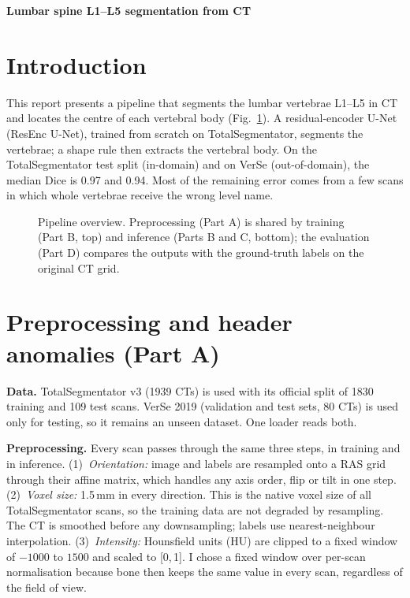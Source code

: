 \documentclass[10pt,a4paper]{article}
\begin{document}
\small

{\sffamily\bfseries\Large Lumbar spine L1--L5 segmentation from CT}

\section{Introduction}
This report presents a pipeline that segments the lumbar vertebrae L1--L5 in CT and locates the centre of each vertebral body (Fig.~\ref{fig:pipeline}). A residual-encoder U-Net (ResEnc U-Net), trained from scratch on TotalSegmentator, segments the vertebrae; a shape rule then extracts the vertebral body. On the TotalSegmentator test split (in-domain) and on VerSe (out-of-domain), the median Dice is 0.97 and 0.94. Most of the remaining error comes from a few scans in which whole vertebrae receive the wrong level name.

\begin{figure}[h]
\centering
\resizebox{0.72\linewidth}{!}{}
\caption{Pipeline overview. Preprocessing (Part A) is shared by training (Part B, top) and inference (Parts B and C, bottom); the evaluation (Part D) compares the outputs with the ground-truth labels on the original CT grid.}
\label{fig:pipeline}
\end{figure}

\section{Preprocessing and header anomalies (Part A)}
\textbf{Data.} TotalSegmentator v3 (1939 CTs) is used with its official split of 1830 training and 109 test scans. VerSe 2019 (validation and test sets, 80 CTs) is used only for testing, so it remains an unseen dataset. One loader reads both.

\textbf{Preprocessing.} Every scan passes through the same three steps, in training and in inference.
(1)~\emph{Orientation:} image and labels are resampled onto a RAS grid through their affine matrix, which handles any axis order, flip or tilt in one step.
(2)~\emph{Voxel size:} 1.5\,mm in every direction. This is the native voxel size of all TotalSegmentator scans, so the training data are not degraded by resampling. The CT is smoothed before any downsampling; labels use nearest-neighbour interpolation.
(3)~\emph{Intensity:} Hounsfield units (HU) are clipped to a fixed window of $-1000$ to $1500$ and scaled to [0,\,1]. I chose a fixed window over per-scan normalisation because bone then keeps the same value in every scan, regardless of the field of view.
\end{document}
